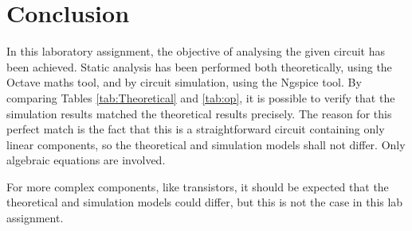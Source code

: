 \section{Conclusion}
\label{sec:conclusion}

In this laboratory assignment, the objective of analysing the given circuit has been achieved. Static analysis has been performed both theoretically, using the Octave maths tool, and by circuit simulation, using the Ngspice tool. By comparing Tables \ref{tab:Theoretical} and \ref{tab:op}, it is possible to verify that the simulation results matched the theoretical results precisely. The reason for this perfect match is the fact that this is a straightforward circuit containing only linear components, so the theoretical and simulation models shall not differ. Only algebraic equations are involved.
\par
For more complex components, like transistors, it should be expected that the theoretical and simulation models could differ, but this is not the case in this lab assignment.
